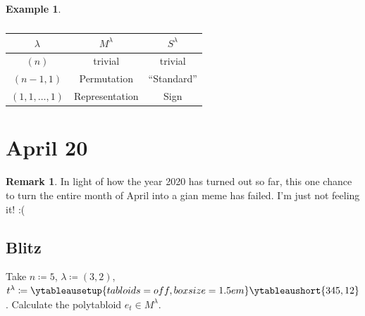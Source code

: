 \documentclass[12pt]{article}
\theoremstyle{definition}
\newtheorem*{remark}{Remark}
\newtheorem{example}{Example}[section]
\begin{document}
\begin{example}
    \begin{table}[H]
        \centering
        \begin{tabular}{|| c | c | c ||}
            \hline
            $\lambda$ & $M^{\lambda}$ & $S^{\lambda}$ \\
            \hline
            $(n)$ & trivial & trivial \\
            $(n-1,1)$ & Permutation & ``Standard'' \\
            $(1,1,\dotsc,1)$ & Representation & Sign \\
            \hline
        \end{tabular}
        \caption{}
        \label{tab:Table11}
    \end{table}
\end{example}

\section{April 20}
\begin{remark}
    In light of how the year 2020 has turned out so far, this one chance to turn the entire month of April into a gian meme has failed. I'm just not feeling it! :(
\end{remark}
\subsection{Blitz}
Take $n \coloneqq  5$, $\lambda \coloneqq  (3,2)$, $t^{\lambda} \coloneqq  \ytableausetup{tabloids = off,boxsize=1.5em} \ytableaushort{345,12}$. Calculate the polytabloid $e_t \in M^{\lambda}$.
\end{document}
